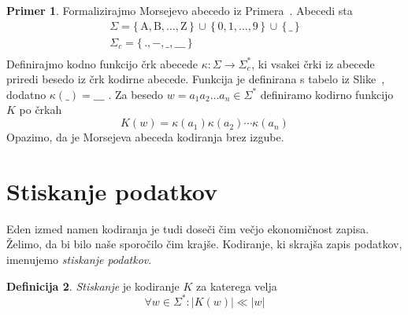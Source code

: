 \documentclass{amsart}
\theoremstyle{definition} %
\newtheorem{definicija}{Definicija}[section]
\newtheorem{primer}[definicija]{Primer}
\newtheorem{opomba}[definicija]{Opomba}
\theoremstyle{plain} %
\begin{document}

\begin{primer}
    
    Formalizirajmo Morsejevo abecedo iz Primera~. Abecedi sta
    \begin{gather*}
        \Sigma = \{\, \text{A},  \text{B}, \ldots, \text{Z} \,\} \, \cup \, \{\, 0, 1, \ldots, 9 \,\} \, \cup \, \{\, \_ \,\} \\
        \Sigma_c = \{\, ., -, \_, \_\_\_ \,\} \\
    \end{gather*}
    Definirajmo kodno funkcijo črk abecede $ \kappa \colon \Sigma \to \Sigma_c^* $, ki vsakei črki iz abecede
    priredi besedo iz črk kodirne abecede. Funkcija je definirana s tabelo iz Slike~,
    dodatno $ \kappa(\_) = \_\_\_ $ . Za besedo $ w = a_1a_2 \ldots a_n \in \Sigma^* $ definiramo kodirno 
    funkcijo $ K $ po črkah
    \[
        K(w) = \kappa(a_1)\kappa(a_2)\cdots\kappa(a_n)
    \]
    Opazimo, da je Morsejeva abeceda kodiranja brez izgube.

\end{primer}

\section{Stiskanje podatkov}

Eden izmed namen kodiranja je tudi doseči čim večjo ekonomičnost zapisa. Želimo, da bi bilo naše sporočilo
čim krajše. Kodiranje, ki skrajša zapis podatkov, imenujemo \textit{stiskanje podatkov}.

\begin{definicija}
    
    \textit{Stiskanje} je kodiranje $ K $ za katerega velja 
    \[ 
    \forall w \in \Sigma^* \colon \left\lvert K(w)\right\rvert \ll \left\lvert w \right\rvert
    \]

\end{definicija}

    

\end{document}
